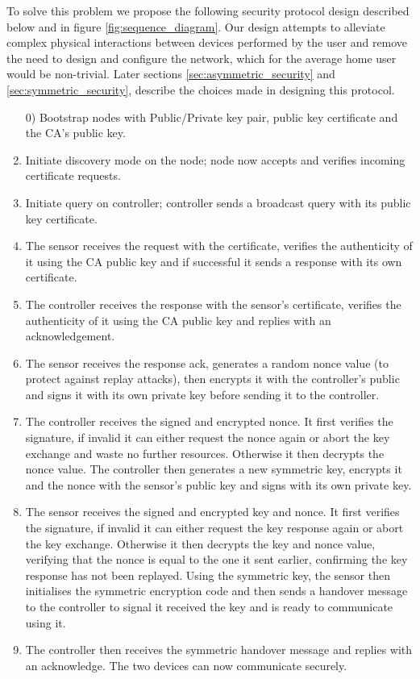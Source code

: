 \documentclass[conference]{./sty/IEEEtran}
\begin{document}
To solve this problem we propose the following security protocol design described below and in figure \ref{fig:sequence_diagram}. Our design attempts to alleviate complex physical interactions between devices performed by the user\cite{MessageBottle} and remove the need to design and configure the network, which for the average home user would be non-trivial. Later sections \ref{sec:asymmetric_security} and \ref{sec:symmetric_security}, describe the choices made in designing this protocol.
\begin{enumerate}
  \item [0)] Bootstrap nodes with Public/Private key pair, public key certificate and the CA's public key.
  \item Initiate discovery mode on the node; node now accepts and verifies incoming certificate requests.
  \item Initiate query on controller; controller sends a broadcast query with its public key certificate.
  \item The sensor receives the request with the certificate, verifies the authenticity of it using the CA public key and if successful it sends a response with its own certificate.
  \item The controller receives the response with the sensor's certificate, verifies the authenticity of it using the CA public key and replies with an acknowledgement.
  \item The sensor receives the response ack, generates a random nonce value (to protect against replay attacks), then encrypts it with the controller's public and signs it with its own private key before sending it to the controller.
  \item The controller receives the signed and encrypted nonce. It first verifies the signature, if invalid it can either request the nonce again or abort the key exchange and waste no further resources. Otherwise it then decrypts the nonce value. The controller then generates a new symmetric key, encrypts it and the nonce with the sensor's public key and signs with its own private key.
  \item The sensor receives the signed and encrypted key and nonce. It first verifies the signature, if invalid it can either request the key response again or abort the key exchange. Otherwise it then decrypts the key and nonce value, verifying that the nonce is equal to the one it sent earlier, confirming the key response has not been replayed. Using the symmetric key, the sensor then initialises the symmetric encryption code and then sends a handover message to the controller to signal it received the key and is ready to communicate using it.
  \item The controller then receives the symmetric handover message and replies with an acknowledge. The two devices can now communicate securely.
\end{enumerate} 
\end{document}
